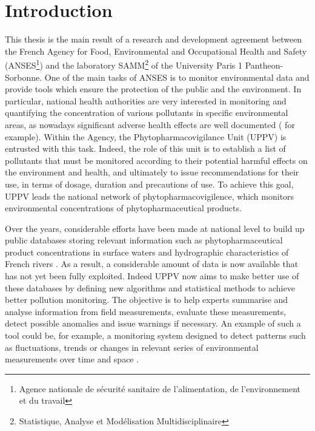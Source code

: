 \chapter{Introduction}\label{chp:1}


This thesis is the  main  result  of  a  research  and  development  agreement  between  the  French Agency for Food, Environmental and Occupational Health and Safety (ANSES\footnote{Agence nationale de sécurité sanitaire de l'alimentation, de l'environnement et du travail}) and the laboratory SAMM\footnote{Statistique, Analyse et Modélisation Multidisciplinaire} of the University Paris 1 Pantheon-Sorbonne.  One of the main tasks of ANSES is to monitor environmental data and provide tools which ensure the protection of the public and the environment.  In particular, national health authorities are very interested in monitoring and quantifying the concentration of various pollutants in specific environmental areas, as nowadays significant adverse health effects are well documented (\cite{khopkar2007,Marchant2018,NOUGADERE201432} for example). Within the Agency, the Phytopharmacovigilance Unit (UPPV) is entrusted with this task.  Indeed, the role of this unit is to establish a list of pollutants that must be monitored according to their potential harmful effects on the environment and health, and ultimately to issue recommendations for their use, in terms of dosage, duration and precautions of use. To achieve this goal, UPPV leads the national network of phytopharmacovigilence, which monitors environmental concentrations of phytopharmaceutical products.

Over the years, considerable efforts have been made at national level to build up public databases storing relevant information such as phytopharmaceutical product concentrations in surface waters \citep{Naiade} and hydrographic characteristics of French rivers \citep{IGN:BD:TOPO}. As a result, a considerable amount of data is now available that has not yet been fully exploited. Indeed UPPV now aims to  make  better  use  of  these  databases  by  defining  new  algorithms  and  statistical methods  to  achieve  better  pollution  monitoring.  The objective  is  to  help  experts summarise and  analyse  information  from  field  measurements, evaluate  these  measurements, detect possible  anomalies and issue  warnings if necessary. An example of such a tool  could be, for example, a monitoring system designed to detect patterns  such  as  fluctuations,  trends  or changes in relevant series of environmental measurements over time and space \citep{Manly2008}. \\

